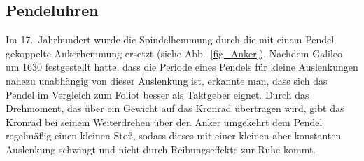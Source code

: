  \subsection{Pendeluhren}

Im 17.\ Jahrhundert wurde die Spindelhemmung durch die mit einem Pendel gekoppelte 
Ankerhemmung
ersetzt (siehe Abb.\ \ref{fig_Anker}). 
Nachdem Galileo 
um 1630 festgestellt hatte, dass die Periode eines Pendels f\"ur kleine Auslenkungen 
nahezu unabh\"angig von dieser Auslenkung ist, erkannte man, dass sich das Pendel im Vergleich zum Foliot 
besser als Taktgeber eignet. Durch das Drehmoment, das \"uber ein Gewicht auf das Kronrad \"ubertragen
wird, gibt das Kronrad bei seinem Weiterdrehen \"uber den Anker umgekehrt dem Pendel regelm\"a\ss ig 
einen kleinen Sto\ss, sodass dieses 
mit einer kleinen aber konstanten Auslenkung schwingt und nicht durch Reibungseffekte zur Ruhe kommt. 

